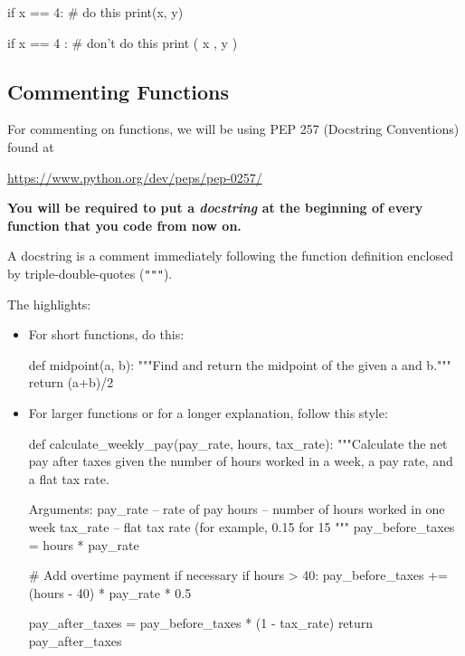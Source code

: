 \documentclass[11pt]{cselabheader}
\begin{document}
{\begin{itemize}
    \begin{python3code}
if x == 4: # do this
    print(x, y)

if x == 4 : # don't do this
    print ( x , y )
    \end{python3code}
\end{itemize}

\pagebreak
\subsection{Commenting Functions}

For commenting on functions, we will be using PEP 257 (Docstring Conventions)
found at
\begin{center}
  \url{https://www.python.org/dev/peps/pep-0257/}
\end{center}

\begin{center}
\bfseries \large You will be required to put a \emph{docstring} at the beginning
of every function that you code from now on.
\end{center}
A docstring is a comment immediately
following the function definition enclosed by triple-double-quotes (\texttt{"""}).

The highlights:
\begin{itemize}
  \item For short functions, do this:

    \begin{python3code}
def midpoint(a, b):
    """Find and return the midpoint of the given a and b."""
    return (a+b)/2
    \end{python3code}

  \item For larger functions or for a longer explanation, follow this style:

    \begin{python3code}
def calculate_weekly_pay(pay_rate, hours, tax_rate):
    """Calculate the net pay after taxes given the number of hours worked 
    in a week, a pay rate, and a flat tax rate.

    Arguments:
    pay_rate -- rate of pay
    hours -- number of hours worked in one week
    tax_rate -- flat tax rate (for example, 0.15 for 15%
    """
    pay_before_taxes = hours * pay_rate

    # Add overtime payment if necessary
    if hours > 40:
        pay_before_taxes += (hours - 40) * pay_rate * 0.5

    pay_after_taxes = pay_before_taxes * (1 - tax_rate)
    return pay_after_taxes
    \end{python3code}


\end{itemize}}
\end{document}
